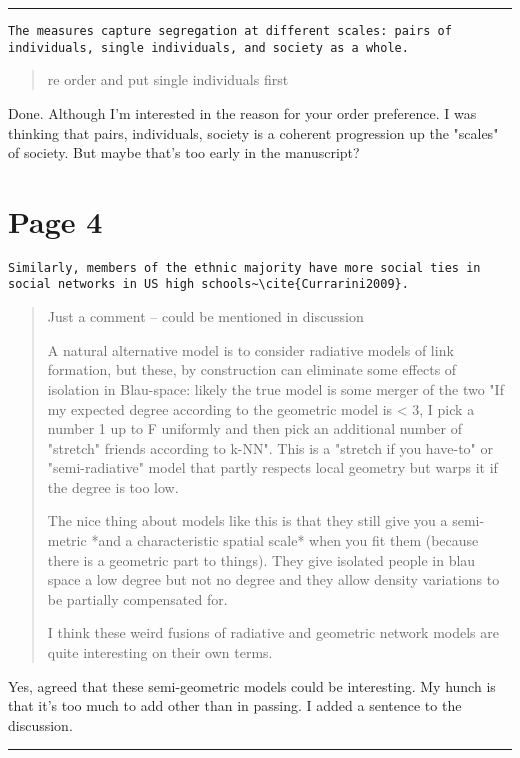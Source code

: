 \documentclass{scrartcl}
\begin{document}
\hrule

\begin{lstlisting}
The measures capture segregation at different scales: pairs of individuals, single individuals, and society as a whole.
\end{lstlisting}
\begin{quote}
re order and put single individuals first
\end{quote}
Done. Although I'm interested in the reason for your order preference. I was thinking that pairs, individuals, society is a coherent progression up the "scales" of society. But maybe that's too early in the manuscript?

\section*{Page 4}

\begin{lstlisting}
Similarly, members of the ethnic majority have more social ties in social networks in US high schools~\cite{Currarini2009}.
\end{lstlisting}
\begin{quote}
Just a comment -- could be mentioned in discussion

A natural alternative model is to consider radiative models of link formation, but these, by construction can eliminate some effects of isolation in Blau-space: likely the true model is some merger of the two "If my expected degree according to the geometric model is < 3, I pick a number 1 up to F uniformly and then pick an additional number of "stretch" friends according to k-NN". This is a "stretch if you have-to" or "semi-radiative" model that partly respects local geometry but warps it if the degree is too low.

The nice thing about models like this is that they still give you a semi-metric *and a characteristic spatial scale* when you fit them (because there is a geometric part to things). They give isolated people in blau space a low degree but not no degree and they allow density variations to be partially compensated for.

I think these weird fusions of radiative and geometric network models are quite interesting on their own terms.
\end{quote}
Yes, agreed that these semi-geometric models could be interesting. My hunch is that it's too much to add other than in passing. I added a sentence to the discussion.

\hrule
\end{document}
